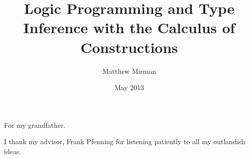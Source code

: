 \documentclass[12pt]{cmuthesis}
\begin{document}
 
\frontmatter

\pagestyle{empty}

\title{ 
{\bf Logic Programming and Type Inference with the Calculus of Constructions }}
\author{Matthew Mirman}
\date{May 2013}
\trnumber{}


\support{}
\disclaimer{}


\maketitle

\begin{dedication}
For my grandfather.
\end{dedication}

\pagestyle{plain} %


\begin{abstract}



\end{abstract}

\begin{acknowledgments}
I thank my advisor, Frank Pfenning for listening patiently to all my outlandish ideas.
\end{acknowledgments}

\tableofcontents
\mainmatter

\renewcommand{\baselinestretch}{1.66}\normalsize

%
%
%
%
%
\end{document}
